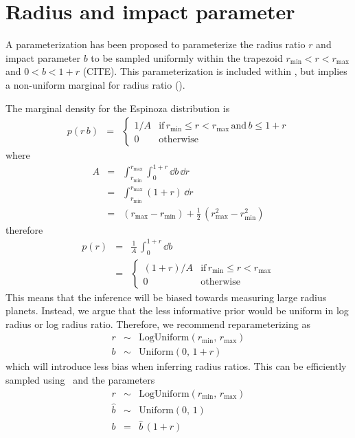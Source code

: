 \documentclass[modern]{aastex62}
\begin{document}
\section{Radius and impact parameter}

A parameterization has been proposed to parameterize the radius ratio $r$ and impact parameter $b$ to be sampled uniformly within the trapezoid $r_\mathrm{min} < r < r_\mathrm{max}$ and $0 < b < 1 + r$ (CITE).
This parameterization is included within \exoplanet, but implies a non-uniform marginal for radius ratio ().

The marginal density for the Espinoza distribution is
\begin{eqnarray}
p(r\,b) &=& \left\{\begin{array}{ll}
1/A & \mathrm{if}\,r_\mathrm{min} \le r < r_\mathrm{max}\,\mathrm{and}\,b\le 1+r\\
0 & \mathrm{otherwise}
\end{array} \right.
\end{eqnarray}
where
\begin{eqnarray}
A &=& \int_{r_\mathrm{min}}^{r_\mathrm{max}} \int_{0}^{1+r}\dd b\,\dd r \\
&=& \int_{r_\mathrm{min}}^{r_\mathrm{max}} (1 + r)\,\dd r\\
&=& (r_\mathrm{max} - r_\mathrm{min}) + \frac{1}{2}\,(r_\mathrm{max}^2 - r_\mathrm{min}^2)
\end{eqnarray}
therefore
\begin{eqnarray}
p(r) &=& \frac{1}{A}\,\int_{0}^{1+r}\dd b \\
&=& \left\{\begin{array}{ll}
  (1+r)/A & \mathrm{if}\,r_\mathrm{min} \le r < r_\mathrm{max} \\
  0 & \mathrm{otherwise}
\end{array}\right.
\end{eqnarray}
This means that the inference will be biased towards measuring large radius planets.
Instead, we argue that the less informative prior would be uniform in log radius or log radius ratio.
Therefore, we recommend reparameterizing as
\begin{eqnarray}
r &\sim& \mathrm{LogUniform}(r_\mathrm{min},\,r_\mathrm{max}) \\
b &\sim& \mathrm{Uniform}(0,\,1+r)
\end{eqnarray}
which will introduce less bias when inferring radius ratios.
This can be efficiently sampled using \exoplanet\ and the parameters
\begin{eqnarray}
  r &\sim& \mathrm{LogUniform}(r_\mathrm{min},\,r_\mathrm{max}) \\
  \hat{b} &\sim& \mathrm{Uniform}(0,\,1) \\
  b &=& \hat{b}\,(1 + r)
\end{eqnarray}
\end{document}
